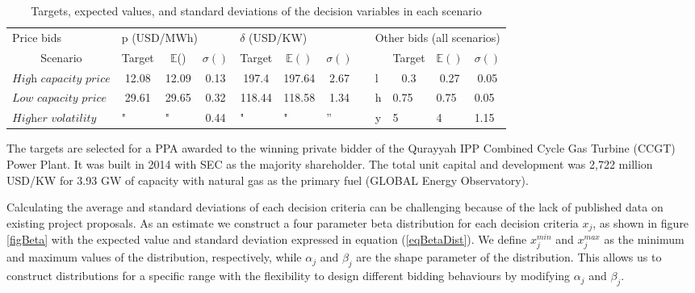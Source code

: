 \documentclass[informs]{informs3}
\begin{document}
\begin{table}[tableScenarios]
\caption {Targets, expected values, and standard deviations of the decision variables in each scenario } \label{tableScenarios}
\begin{tabular}{@{}lcccccclllll@{}}
\cmidrule(r){1-7} \cmidrule(l){9-12}
Price bids                     & \multicolumn{3}{l}{p (USD/MWh)}                            & \multicolumn{3}{l}{$\delta$ (USD/KW)}                                  &  & \multicolumn{4}{l}{Other bids (all scenarios)}                                                       \\ \cmidrule(r){1-7} \cmidrule(l){9-12} 
\multicolumn{1}{c}{Scenario}   & Target                & $\mathbb{E}$()        & $\sigma()$ & Target                & $\mathbb{E}()$        & $\sigma()$             &  &   & \multicolumn{1}{c}{Target} & \multicolumn{1}{c}{$\mathbb{E}()$} & \multicolumn{1}{c}{$\sigma()$} \\
$\textit{High capacity price}$ & 12.08                 & 12.09                 & 0.13       & 197.4                 & 197.64                & 2.67                   &  & l & \multicolumn{1}{c}{0.3}    & \multicolumn{1}{c}{0.27}           & \multicolumn{1}{c}{0.05}       \\
$\textit{Low capacity price}$  & 29.61                 & 29.65                 & 0.32       & 118.44                & 118.58                & 1.34                   &  & h & 0.75                       & 0.75                               & 0.05                           \\
$\textit{Higher volatility}$  & \multicolumn{1}{l}{"} & \multicolumn{1}{l}{"} & 0.44       & \multicolumn{1}{l}{"} & \multicolumn{1}{l}{"} & \multicolumn{1}{l}{''} &  & y & 5                          & 4                                  & 1.15                           \\ \cmidrule(r){1-7} \cmidrule(l){9-12} 
\end{tabular}
\end{table}

The targets are selected for a PPA awarded to the winning private bidder of the Qurayyah IPP Combined Cycle Gas Turbine (CCGT) Power Plant. It was built in 2014 with SEC as the majority shareholder. The total unit capital and development was 2,722 million USD/KW for 3.93 GW of capacity with natural gas as the primary fuel (GLOBAL Energy Observatory).

Calculating the average and standard deviations of each decision criteria can be challenging because of the lack of published data on existing project proposals. As an estimate  we construct a four parameter beta distribution for each decision criteria $x_j$, as shown in figure \ref{figBeta}  with the expected value and standard deviation expressed in equation (\ref{eqBetaDist}). We define $x_j^{min}$ and $x_j^{max}$ as the minimum and maximum values of the distribution, respectively, while $\alpha_j$ and $\beta_j$ are the shape parameter of the distribution. This allows us to construct distributions for  a specific range with the flexibility to design different bidding behaviours by modifying $\alpha_j$ and $\beta_j$.
\end{document}
